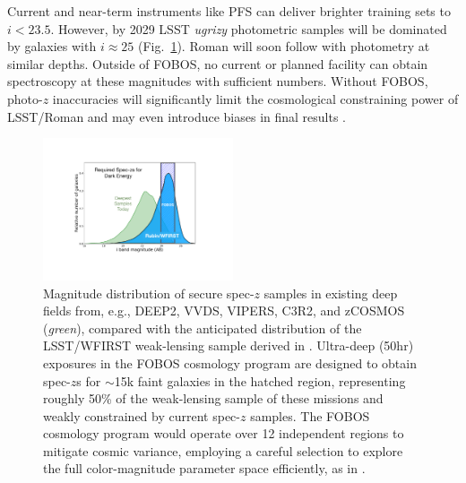 \documentclass[oneside,11pt]{amsart}
\begin{document}
Current and near-term instruments like PFS can deliver brighter training sets to $i < 23.5$.  However, by 2029 LSST \textit{ugrizy} photometric samples will be dominated by galaxies with $i \approx 25$ (Fig.~\ref{fig:cosmos_magdist}).  Roman will soon follow with photometry at similar depths.  Outside of FOBOS, no current or planned facility can obtain spectroscopy at these magnitudes with sufficient numbers.  Without FOBOS, photo-$z$ inaccuracies will significantly limit the cosmological constraining power of LSST/Roman and may even introduce biases in final results \citep{huterer06, LSSTDESCSRD}.  


\begin{figure}%
\vspace{-0.2cm}
\includegraphics[width=0.5\textwidth]{figs/fobos_cosmology_v2.pdf}
\caption{\footnotesize Magnitude distribution of secure spec-$z$ samples in existing deep fields from, e.g., DEEP2, VVDS, VIPERS, C3R2, and zCOSMOS ({\it green}), compared with the anticipated distribution of the LSST/WFIRST weak-lensing sample derived in \citet[][{\it blue}]{hemmati18}. Ultra-deep (50hr) exposures in the FOBOS cosmology program are designed to obtain spec-$z$s for $\sim$15k faint galaxies in the hatched region, representing roughly 50\% of the weak-lensing sample of these missions and weakly constrained by current spec-$z$ samples. The FOBOS cosmology program would operate over 12 independent regions to mitigate cosmic variance, employing a careful selection to explore the full color-magnitude parameter space efficiently, as in \cite{masters15}.}
\label{fig:cosmos_magdist}
\end{figure}
\end{document}
